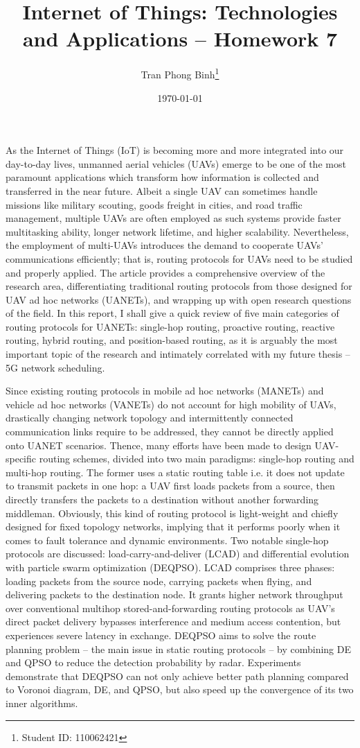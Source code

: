 \documentclass[12pt, a4paper, onside]{article}
\title{\textbf{Internet of Things: Technologies and Applications -- Homework 7}}
\author{Tran Phong Binh\thanks{Student ID: 110062421}}
\affil{Department of Computer Science, National Tsing Hua University}
\date{\today}
\begin{document}
\maketitle

As the Internet of Things (IoT) is becoming more and more integrated into our day-to-day lives, unmanned aerial vehicles (UAVs) emerge to be one of the most paramount applications which transform how information is collected and transferred in the near future. Albeit a single UAV can sometimes handle missions like military scouting, goods freight in cities, and road traffic management, multiple UAVs are often employed as such systems provide faster multitasking ability, longer network lifetime, and higher scalability. Nevertheless, the employment of multi-UAVs introduces the demand to cooperate UAVs' communications efficiently; that is, routing protocols for UAVs need to be studied and properly applied. The article \cite{uav} provides a comprehensive overview of the research area, differentiating traditional routing protocols from those designed for UAV ad hoc networks (UANETs), and wrapping up with open research questions of the field. In this report, I shall give a quick review of five main categories of routing protocols for UANETs: single-hop routing, proactive routing, reactive routing, hybrid routing, and position-based routing, as it is arguably the most important topic of the research and intimately correlated with my future thesis -- 5G network scheduling.

Since existing routing protocols in mobile ad hoc networks (MANETs) and vehicle ad hoc networks (VANETs) do not account for high mobility of UAVs, drastically changing network topology and intermittently connected communication links require to be addressed, they cannot be directly applied onto UANET scenarios. Thence, many efforts have been made to design UAV-specific routing schemes, divided into two main paradigms: single-hop routing and multi-hop routing. The former uses a static routing table i.e. it does not update to transmit packets in one hop: a UAV first loads packets from a source, then directly transfers the packets to a destination without another forwarding middleman. Obviously, this kind of routing protocol is light-weight and chiefly designed for fixed topology networks, implying that it performs poorly when it comes to fault tolerance and dynamic environments. Two notable single-hop protocols are discussed: load-carry-and-deliver (LCAD) and differential evolution with particle swarm optimization (DEQPSO). LCAD comprises three phases: loading packets from the source node, carrying packets when flying, and delivering packets to the destination node. It grants higher network throughput over conventional multihop stored-and-forwarding routing protocols as UAV's direct packet delivery bypasses interference and medium access contention, but experiences severe latency in exchange. DEQPSO aims to solve the route planning problem -- the main issue in static routing protocols -- by combining DE and QPSO to reduce the detection probability by radar. Experiments demonstrate that DEQPSO can not only achieve better path planning compared to Voronoi diagram, DE, and QPSO, but also speed up the convergence of its two inner algorithms.
\end{document}

